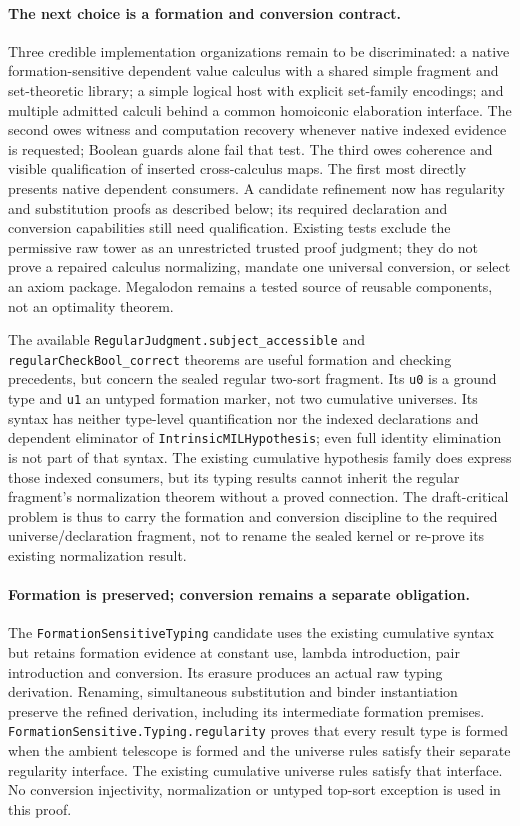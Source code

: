 \documentclass[11pt]{article}
\theoremstyle{definition}
\theoremstyle{remark}
\begin{document}
\paragraph{The next choice is a formation and conversion contract.}
Three credible implementation organizations remain to be discriminated:
a native formation-sensitive dependent value calculus with a shared simple
fragment and set-theoretic library; a simple logical host with explicit
set-family encodings; and multiple admitted calculi behind a common
homoiconic elaboration interface. The second owes witness and computation
recovery whenever native indexed evidence is requested; Boolean guards alone
fail that test. The third owes coherence and visible qualification of inserted
cross-calculus maps. The first most directly presents native dependent
consumers. A candidate refinement now has regularity and substitution proofs
as described below; its required declaration and conversion capabilities
still need qualification. Existing tests exclude the permissive raw
tower as an unrestricted trusted proof judgment; they do not prove a repaired
calculus normalizing, mandate one universal conversion, or select an axiom
package. Megalodon remains a tested source of reusable components, not an
optimality theorem.

The available \nolinkurl{RegularJudgment.subject_accessible} and
\nolinkurl{regularCheckBool_correct} theorems are useful formation and
checking precedents, but concern the sealed regular two-sort fragment. Its
\nolinkurl{u0} is a ground type and \nolinkurl{u1} an untyped formation
marker, not two cumulative universes. Its syntax has neither type-level
quantification nor the indexed declarations and dependent eliminator of
\nolinkurl{IntrinsicMILHypothesis}; even full identity elimination is not
part of that syntax. The existing cumulative hypothesis family does express
those indexed consumers, but its typing results cannot inherit the regular
fragment's normalization theorem without a proved connection. The
draft-critical problem is thus to carry the formation and conversion
discipline to the required universe/declaration fragment, not to rename the
sealed kernel or re-prove its existing normalization result.

\paragraph{Formation is preserved; conversion remains a separate obligation.}
The \nolinkurl{FormationSensitiveTyping} candidate uses the existing cumulative
syntax but retains formation evidence at constant use, lambda introduction,
pair introduction and conversion. Its erasure produces an actual raw typing
derivation. Renaming, simultaneous substitution and binder instantiation
preserve the refined derivation, including its intermediate formation
premises. \nolinkurl{FormationSensitive.Typing.regularity} proves
that every result type is formed when the ambient telescope is formed and
the universe rules satisfy their separate regularity interface. The existing
cumulative universe rules satisfy that interface. No conversion injectivity,
normalization or untyped top-sort exception is used in this proof.
\end{document}
